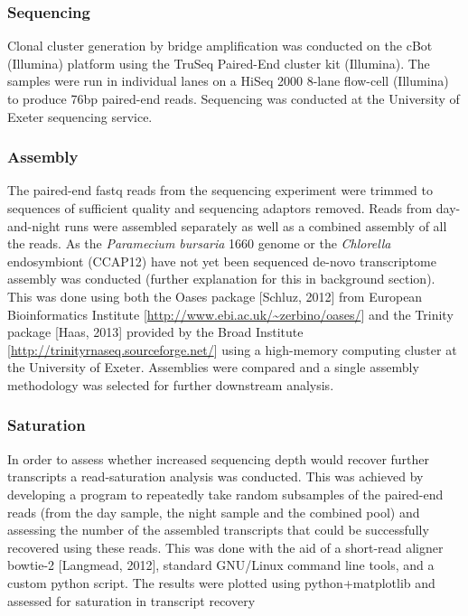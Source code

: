 \documentclass[a4paper,11pt]{article}
\begin{document}
\subsubsection{Sequencing}

Clonal cluster generation by bridge amplification was conducted on the cBot (Illumina) platform using the TruSeq Paired-End cluster kit (Illumina).  
The samples were run in individual lanes on a HiSeq 2000 8-lane flow-cell (Illumina) to produce 76bp paired-end reads. 
Sequencing was conducted at the University of Exeter sequencing service.

\subsubsection{Assembly}
The paired-end fastq reads from the sequencing experiment were trimmed to sequences of sufficient quality and sequencing adaptors removed. 
Reads from day-and-night runs were assembled separately as well as a combined assembly of all the reads. 
As the \textit{Paramecium bursaria} 1660 genome or the \textit{Chlorella} endosymbiont (CCAP12) have not yet been sequenced de-novo transcriptome assembly was conducted (further explanation for this in background section).  
This was done using both the Oases package [Schluz, 2012] from European Bioinformatics Institute [\url{http://www.ebi.ac.uk/~zerbino/oases/}] and the Trinity package [Haas, 2013] provided by the Broad Institute [\url{http://trinityrnaseq.sourceforge.net/}] using a high-memory computing cluster at the University of Exeter.  
Assemblies were compared and a single assembly methodology was selected for further downstream analysis. 

\subsubsection{Saturation}
In order to assess whether increased sequencing depth would recover further transcripts a read-saturation analysis was conducted.  
This was achieved by developing a program to repeatedly take random subsamples of the paired-end reads (from the day sample, the night sample and the combined pool) and assessing the number of the assembled transcripts that could be successfully recovered using these reads.  
This was done with the aid of a short-read aligner bowtie-2 [Langmead, 2012], standard GNU/Linux command line tools, and a custom python script.  
The results were plotted using python+matplotlib and assessed for saturation in transcript recovery
\end{document}
